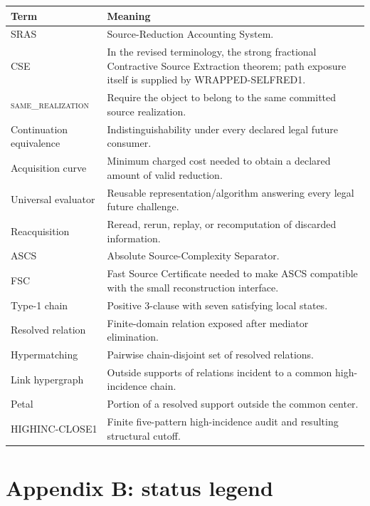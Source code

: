 \documentclass[11pt]{article}
\newcommand{\same}{\textsc{same\_realization}}
\theoremstyle{plain}
\theoremstyle{definition}
\theoremstyle{remark}
\begin{document}
\begin{longtable}{p{} p{}}
\toprule
\textbf{Term} & \textbf{Meaning}\\
\midrule
\endhead
SRAS & Source-Reduction Accounting System.\\
CSE & In the revised terminology, the strong fractional Contractive Source Extraction theorem; path exposure itself is supplied by WRAPPED-SELFRED1.\\
\same & Require the object to belong to the same committed source realization.\\
Continuation equivalence & Indistinguishability under every declared legal future consumer.\\
Acquisition curve & Minimum charged cost needed to obtain a declared amount of valid reduction.\\
Universal evaluator & Reusable representation/algorithm answering every legal future challenge.\\
Reacquisition & Reread, rerun, replay, or recomputation of discarded information.\\
ASCS & Absolute Source-Complexity Separator.\\
FSC & Fast Source Certificate needed to make ASCS compatible with the small reconstruction interface.\\
Type-1 chain & Positive 3-clause with seven satisfying local states.\\
Resolved relation & Finite-domain relation exposed after mediator elimination.\\
Hypermatching & Pairwise chain-disjoint set of resolved relations.\\
Link hypergraph & Outside supports of relations incident to a common high-incidence chain.\\
Petal & Portion of a resolved support outside the common center.\\
HIGHINC-CLOSE1 & Finite five-pattern high-incidence audit and resulting structural cutoff.\\
\bottomrule
\end{longtable}

\section{Appendix B: status legend}
\end{document}
